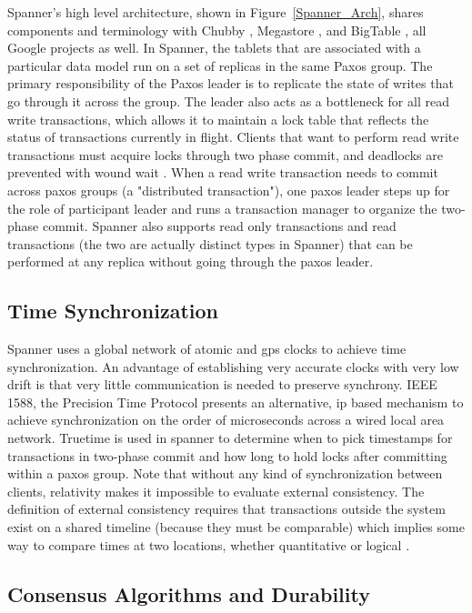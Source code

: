 \documentclass[10pt,twocolumn]{article}
\begin{document}
Spanner's high level architecture, shown in Figure~\ref{Spanner_Arch}, shares components and terminology with Chubby  \cite{chandra_paxos_2007}, Megastore \cite{baker_megastore:_2011}, and BigTable \cite{chang_bigtable:_2008}, all Google projects as well. In Spanner, the tablets that are associated with a particular data model run on a set of replicas in the same Paxos group. The primary responsibility of the Paxos leader is to replicate the state of writes that go through it across the group. The leader also acts as a bottleneck for all read write transactions, which allows it to maintain a lock table that reflects the status of transactions currently in flight. Clients that want to perform read write transactions must acquire locks through two phase commit, and deadlocks are prevented with wound wait \cite{wound_wait}. When a read write transaction needs to commit across paxos groups (a "distributed transaction"), one paxos leader steps up for the role of participant leader and runs a transaction manager to organize the two-phase commit. Spanner also supports read only transactions and read transactions (the two are actually distinct types in Spanner) that can be performed at any replica without going through the paxos leader.




\subsection{Time Synchronization}
Spanner uses a global network of atomic and gps clocks to achieve time synchronization. An advantage of establishing very accurate clocks with very low drift is that very little communication is needed to preserve synchrony. IEEE 1588, the Precision Time Protocol \cite{ratzel_toward_2012} presents an alternative, ip based mechanism to achieve synchronization on the order of microseconds across a wired local area network. Truetime is used in spanner to determine when to pick timestamps for transactions in two-phase commit and how long to hold locks after committing within a paxos group.  Note that without any kind of synchronization between clients, relativity makes it impossible to evaluate external consistency. The definition of external consistency requires that transactions outside the system exist on a shared timeline (because they must be comparable) which implies some way to compare times at two locations, whether quantitative or logical \cite{lamport_time_1978}.


\subsection{Consensus Algorithms and Durability}
\end{document}
